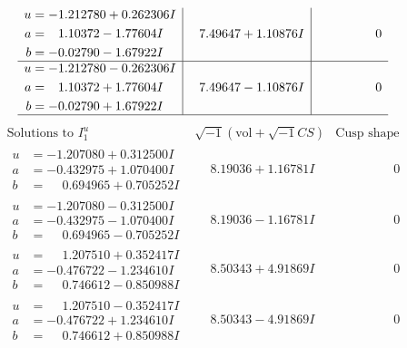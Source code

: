 \documentclass[1p]{elsarticle_modified}
\theoremstyle{definition}
\newcommand{\I}{\sqrt{-1}}
\begin{document}
$$\begin{array}{c|c|c}
\begin{aligned}
u &= -1.212780 + 0.262306 I \\
a &= \phantom{-}1.10372 - 1.77604 I \\
b &= -0.02790 - 1.67922 I\end{aligned}
 & \phantom{-}7.49647 + 1.10876 I & \phantom{-0.000000 } 0 \\ \hline\begin{aligned}
u &= -1.212780 - 0.262306 I \\
a &= \phantom{-}1.10372 + 1.77604 I \\
b &= -0.02790 + 1.67922 I\end{aligned}
 & \phantom{-}7.49647 - 1.10876 I & \phantom{-0.000000 } 0\\
 \hline 
 \end{array}$$\newpage$$\begin{array}{c|c|c}  
\text{Solutions to }I^u_{1}& \I (\text{vol} + \sqrt{-1}CS) & \text{Cusp shape}\\
 \hline 
\begin{aligned}
u &= -1.207080 + 0.312500 I \\
a &= -0.432975 + 1.070400 I \\
b &= \phantom{-}0.694965 + 0.705252 I\end{aligned}
 & \phantom{-}8.19036 + 1.16781 I & \phantom{-0.000000 } 0 \\ \hline\begin{aligned}
u &= -1.207080 - 0.312500 I \\
a &= -0.432975 - 1.070400 I \\
b &= \phantom{-}0.694965 - 0.705252 I\end{aligned}
 & \phantom{-}8.19036 - 1.16781 I & \phantom{-0.000000 } 0 \\ \hline\begin{aligned}
u &= \phantom{-}1.207510 + 0.352417 I \\
a &= -0.476722 - 1.234610 I \\
b &= \phantom{-}0.746612 - 0.850988 I\end{aligned}
 & \phantom{-}8.50343 + 4.91869 I & \phantom{-0.000000 } 0 \\ \hline\begin{aligned}
u &= \phantom{-}1.207510 - 0.352417 I \\
a &= -0.476722 + 1.234610 I \\
b &= \phantom{-}0.746612 + 0.850988 I\end{aligned}
 & \phantom{-}8.50343 - 4.91869 I & \phantom{-0.000000 } 0 \\ \hline\begin{aligned}

\end{aligned}
\end{array}$$
\end{document}
